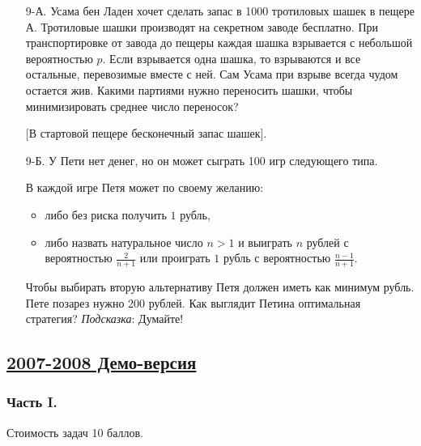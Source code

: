 \begin{enumerate}
\item[9-А.] Усама бен Ладен хочет сделать запас в 1000 тротиловых шашек в пещере А.
Тротиловые шашки производят на секретном заводе бесплатно. При транспортировке от
завода до пещеры каждая шашка взрывается с небольшой вероятностью $p$. Если взрывается
одна шашка, то взрываются и все остальные, перевозимые вместе с ней. Сам Усама при
взрыве всегда чудом остается жив. Какими партиями нужно переносить шашки, чтобы
минимизировать среднее число переносок?

$[$В стартовой пещере бесконечный запас шашек$]$.

\item[9-Б.] У Пети нет денег, но он может сыграть 100 игр следующего типа.

В каждой игре Петя может по своему желанию:

\begin{itemize}
\item либо без риска получить $1$ рубль,
\item либо назвать натуральное число $n>1$ и выиграть $n$ рублей с вероятностью
$\frac{2}{n+1}$ или проиграть $1$ рубль с вероятностью $\frac{n-1}{n+1}$.
\end{itemize}
Чтобы выбирать вторую альтернативу Петя должен иметь как минимум рубль. Пете
позарез нужно 200 рублей. Как выглядит Петина оптимальная стратегия?
\emph{Подсказка}: Думайте!
\end{enumerate}




\newpage
\subsection[2007-2008 Демо-версия]{\hyperref[sec:sol_kr_01_2007_2008_demo]{2007-2008 Демо-версия}}
\label{sec:kr_01_2007_2008_demo}

\subsubsection*{Часть I.}

Стоимость задач 10 баллов.

